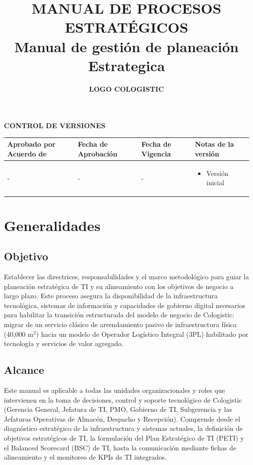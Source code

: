 \documentclass[11pt,letterpaper]{report}
\title{\textbf{\large MANUAL DE PROCESOS ESTRATÉGICOS}\\[0.5em] \textbf{\Huge Manual de gestión de planeación Estrategica }}
\author{\textbf{LOGO COLOGISTIC}}
\date{}
\begin{document}
\maketitle

\begin{center}
\textbf{\large CONTROL DE VERSIONES}
\end{center}
\begin{tabularx}{\textwidth}{p{}p{}p{}X}
\toprule
\textbf{Aprobado por Acuerdo de} & \textbf{Fecha de Aprobación} & \textbf{Fecha de Vigencia} & \textbf{Notas de la versión} \\
\midrule
- & - & - & \begin{itemize} \item Versión inicial \end{itemize} \\
\bottomrule
\end{tabularx}

\newpage

\tableofcontents

\newpage

\chapter{Generalidades}

\section{Objetivo}
Establecer las directrices, responsabilidades y el marco metodológico para guiar la planeación estratégica de TI y su alineamiento con los objetivos de negocio a largo plazo. Este proceso asegura la disponibilidad de la infraestructura tecnológica, sistemas de información y capacidades de gobierno digital necesarios para habilitar la transición estructurada del modelo de negocio de Cologistic: migrar de un servicio clásico de arrendamiento pasivo de infraestructura física (40,000 m$^2$) hacia un modelo de Operador Logístico Integral (3PL) habilitado por tecnología y servicios de valor agregado.

\section{Alcance}
Este manual es aplicable a todas las unidades organizacionales y roles que intervienen en la toma de decisiones, control y soporte tecnológico de Cologistic (Gerencia General, Jefatura de TI, PMO, Gobierno de TI, Subgerencia y las Jefaturas Operativas de Almacén, Despacho y Recepción). Comprende desde el diagnóstico estratégico de la infraestructura y sistemas actuales, la definición de objetivos estratégicos de TI, la formulación del Plan Estratégico de TI (PETI) y el Balanced Scorecard (BSC) de TI, hasta la comunicación mediante fichas de alineamiento y el monitoreo de KPIs de TI integrados.
\end{document}

